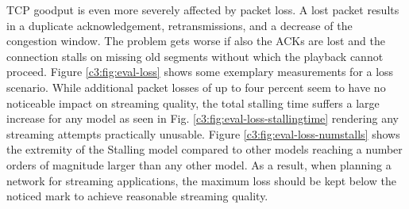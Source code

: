 TCP goodput is even more severely affected by packet loss. A lost packet results in a duplicate acknowledgement, retransmissions, and a decrease of the congestion window. The problem gets worse if also the ACKs are lost and the connection stalls on missing old segments without which the playback cannot proceed. Figure \ref{c3:fig:eval-loss} shows some exemplary measurements for a loss scenario. While additional packet losses of up to four percent seem to have no noticeable impact on streaming quality, the total stalling time suffers a large increase for any model as seen in Fig. \ref{c3:fig:eval-loss-stallingtime} rendering any streaming attempts practically unusable. Figure \ref{c3:fig:eval-loss-numstalls} shows the extremity of the Stalling model compared to other models reaching a number orders of magnitude larger than any other model.
As a result, when planning a network for streaming applications, the maximum loss should be kept below the noticed mark to achieve reasonable streaming quality. 



